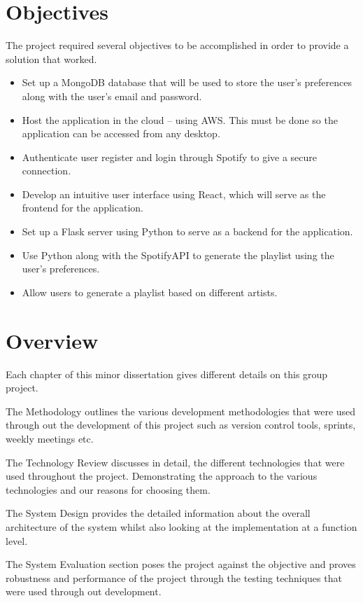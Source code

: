 \section{Objectives}
The project required several objectives to be accomplished in order to provide a solution that worked.
\begin{itemize}
	\item Set up a MongoDB database that will be used to store the user’s preferences along with the user’s email and password.
	\item Host the application in the cloud – using AWS. This must be done so the application can be accessed from any desktop.
	\item Authenticate user register and login through Spotify to give a secure connection.
	\item Develop an intuitive user interface using React, which will serve as the frontend for the application.
	\item Set up a Flask server using Python to serve as a backend for the application.
	\item Use Python along with the SpotifyAPI to generate the playlist using the user’s preferences.
	\item Allow users to generate a playlist based on different artists.
\end{itemize}

\section{Overview}
Each chapter of this minor dissertation gives different details on this group project.\newline

The Methodology outlines the various development methodologies that were used through out the development of this project such as version control tools, sprints, weekly meetings etc.\newline

The Technology Review discusses in detail, the different technologies that were used throughout the project. Demonstrating the approach to the various technologies and our reasons for choosing them.\newline

The System Design provides the detailed information about the overall architecture of the system whilst also looking at the implementation at a function level.\newline

The System Evaluation section poses the project against the objective and proves robustness and performance of the project through the testing techniques that were used through out development.\newline

